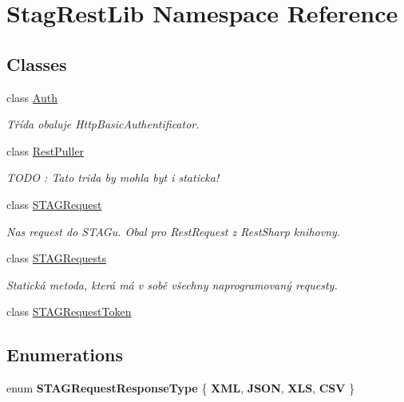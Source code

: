 \hypertarget{namespace_stag_rest_lib}{}\section{Stag\+Rest\+Lib Namespace Reference}
\label{namespace_stag_rest_lib}
\subsection*{Classes}
\begin{DoxyCompactItemize}
\item 
class \hyperlink{class_stag_rest_lib_1_1_auth}{Auth}
\begin{DoxyCompactList}\small\item\em Třída obaluje Http\+Basic\+Authentificator. \end{DoxyCompactList}\item 
class \hyperlink{class_stag_rest_lib_1_1_rest_puller}{Rest\+Puller}
\begin{DoxyCompactList}\small\item\em T\+O\+DO \+: Tato trida by mohla byt i staticka! \end{DoxyCompactList}\item 
class \hyperlink{class_stag_rest_lib_1_1_s_t_a_g_request}{S\+T\+A\+G\+Request}
\begin{DoxyCompactList}\small\item\em Nas request do S\+T\+A\+Gu. Obal pro Rest\+Request z Rest\+Sharp knihovny. \end{DoxyCompactList}\item 
class \hyperlink{class_stag_rest_lib_1_1_s_t_a_g_requests}{S\+T\+A\+G\+Requests}
\begin{DoxyCompactList}\small\item\em Statická metoda, která má v sobě všechny naprogramovaný requesty. \end{DoxyCompactList}\item 
class \hyperlink{class_stag_rest_lib_1_1_s_t_a_g_request_token}{S\+T\+A\+G\+Request\+Token}
\end{DoxyCompactItemize}
\subsection*{Enumerations}
\begin{DoxyCompactItemize}
\item 
\mbox{\label{namespace_stag_rest_lib_a6c8aae597e6b1591d6b59b97d4f6c471}} 
enum {\bfseries S\+T\+A\+G\+Request\+Response\+Type} \{ {\bfseries X\+ML}, 
{\bfseries J\+S\+ON}, 
{\bfseries X\+LS}, 
{\bfseries C\+SV}
 \}
\end{DoxyCompactItemize}
